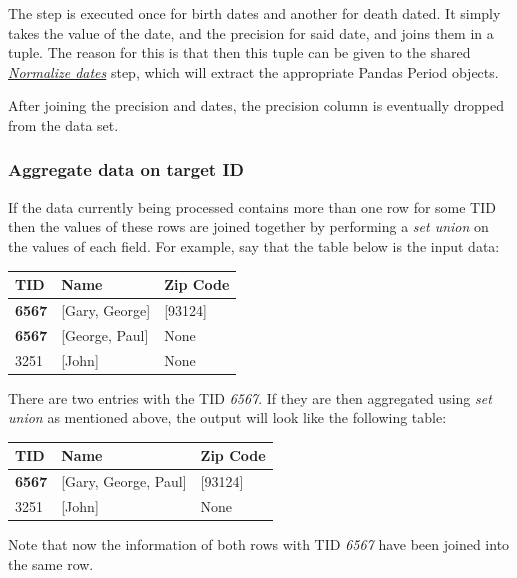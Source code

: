 \documentclass[epsfig,a4paper,11pt,titlepage,twoside,openany]{book}
\begin{document}
The step is executed once for birth dates and another for death dated. It simply takes the value of the date, and the precision for said date, and joins them in a tuple. The reason for this is that then this tuple can be given to the shared \hyperref[sec:data-preprocessiong-date-normalization]{\textit{Normalize dates}} step, which will extract the appropriate Pandas Period objects.

After joining the precision and dates, the precision column is eventually dropped from the data set. 

\subsubsection{Aggregate data on target ID}
\label{sec:data-preprocessiong-ext-aggregate-tid}

If the data currently being processed contains more than one row for some TID then the values of these rows are joined together by performing a \textit{set union} on the values of each field. For example, say that the table below is the input data:

\begin{table}[H]
\centering
\begin{tabular}{l|l|l}
TID  & Name               & Zip Code    \\ \hline
\textbf{6567} & {[}Gary, George{]} & {[}93124{]} \\
\textbf{6567} & {[}George, Paul{]} & None       \\
3251 & {[}John{]} &    None    

\end{tabular}
\end{table}

There are two entries with the TID \textit{6567}. If they are then aggregated using \textit{set union} as mentioned above, the output will look like the following table:

\begin{table}[H]
\centering
\begin{tabular}{l|l|l}
TID  & Name                     & Zip Code    \\ \hline
\textbf{6567} & {[}Gary, George, Paul{]} & {[}93124{]} \\
3251 & {[}John{]} &    None    
\end{tabular}
\end{table}

Note that now the information of both rows with TID \textit{6567} have been joined into the same row.
\end{document}
